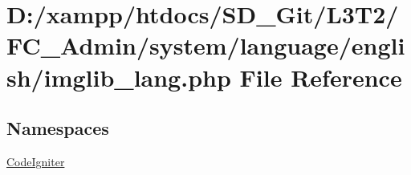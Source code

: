 \hypertarget{imglib__lang_8php}{}\section{D\+:/xampp/htdocs/\+S\+D\+\_\+\+Git/\+L3\+T2/\+F\+C\+\_\+\+Admin/system/language/english/imglib\+\_\+lang.php File Reference}
\label{imglib__lang_8php}
\subsection*{Namespaces}
\begin{DoxyCompactItemize}
\item 
 \hyperlink{namespace_code_igniter}{Code\+Igniter}
\end{DoxyCompactItemize}
